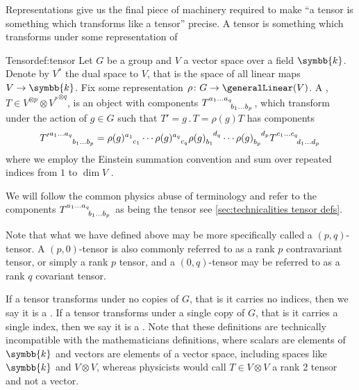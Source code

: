 \documentclass[fleqn]{NotesClass}
\renewcommand{\field}{\symbb{k}}
\newcommand{\action}{\mathbin{.}}
\newcommand{\dual}[1]{{#1^{*}}}
\begin{document}
    Representations give us the final piece of machinery required to make \enquote{a tensor is something which transforms like a tensor} precise.
    A tensor is something which transforms under some representation of 
    \begin{dfn}{Tensor}{def:tensor}
        Let \(G\) be a group and \(V\) a vector space over a field \(\field\).
        Denote by \(\dual{V}\) the dual space to \(V\), that is the space of all linear maps \(V \to \field\).
        Fix some representation \(\rho \colon G \to \generalLinear(V)\).
        A , \(T \in V^{\otimes p} \otimes \dual{V}^{\otimes q}\), is an object with components \(\tensor{T}{^{a_1\dotso a_q}_{b_1 \dotso b_p}}\), which transform under the action of \(g \in G\) such that \(T' = g \action T = \rho(g)T\) has components
        \begin{equation*}
            \tensor{{T'}}{^{a_1\dotso a_q}_{b_1 \dotso b_p}} = \tensor{\rho(g)}{^{a_1}_{c_1}} \dotsm \tensor{\rho(g)}{^{a_q}_{c_q}} \tensor{\rho(g)}{_{b_1}^{d_q}} \dotsm \tensor{\rho(g)}{_{b_p}^{d_p}} \tensor{T}{^{c_1\dotso c_q}_{d_1 \dotso d_p}}
        \end{equation*}
        where we employ the Einstein summation convention and sum over repeated indices from \(1\) to \(\dim V\) \cite[18]{cvitanovic}.
    \end{dfn}
    
    We will follow the common physics abuse of terminology and refer to the components \(\tensor{T}{^{a_1\dotso a_q}_{b_1\dotso b_p}}\) as being the tensor see \cref{sec:technicalities tensor defs}.
    
    Note that what we have defined above may be more specifically called a \((p, q)\)-tensor.
    A \((p, 0)\)-tensor is also commonly referred to as a rank \(p\) contravariant tensor, or simply a rank \(p\) tensor, and a \((0, q)\)-tensor may be referred to as a rank \(q\) covariant tensor.
    
    If a tensor transforms under no copies of \(G\), that is it carries no indices, then we say it is a .
    If a tensor transforms under a single copy of \(G\), that is it carries a single index, then we say it is a .
    Note that these definitions are technically incompatible with the mathematicians definitions, where scalars are elements of \(\field\) and vectors are elements of a vector space, including spaces like \(\field\) and \(V \otimes V\), whereas physicists would call \(T \in V \otimes V\) a rank 2 tensor and not a vector.
    
\end{document}
